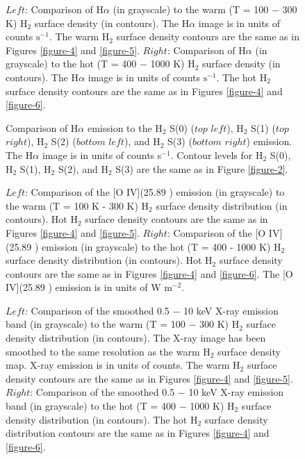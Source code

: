 \documentclass[12pt,preprint]{aastex}
\begin{document}
\clearpage

\begin{figure}
\caption{$Left$: Comparison of  H$\alpha$ (in grayscale) to the warm (T = 100 $-$ 300 K) 
H$_2$ surface density (in contours).  The H$\alpha$ image is in units of counts 
$\mathrm{s^{-1}}$. The warm H$_2$ surface density contours are the same as in 
Figures \ref{figure-4} and \ref{figure-5}.  $Right$: Comparison of H$\alpha$ (in grayscale) 
to the hot (T = 400 $-$ 1000 K) H$_2$ surface density (in contours).  The H$\alpha$ 
image is in units of counts $\mathrm{s^{-1}}$. The hot H$_2$ surface density 
contours are the same as in Figures \ref{figure-4} and \ref{figure-6}.}
\label{figure-10}
\end{figure}

\clearpage

\begin{figure}
\caption{Comparison of H$\alpha$ emission to the H$_2$ S(0) ($top$ $left$),  
H$_2$ S(1) ($top$ $right$),  H$_2$ S(2) ($bottom$ $left$),  and 
H$_2$ S(3) ($bottom$ $right$) emission.  The H$\alpha$ image is in units 
of counts s$^{-1}$.  Contour levels for H$_2$ S(0), H$_2$ S(1), 
H$_2$ S(2), and H$_2$ S(3) are the same as in Figure \ref{figure-2}.}
\label{figure-11}
\end{figure}

\clearpage

\begin{figure}
\caption{$Left$:  Comparison of the [O IV](25.89 \micron) emission (in grayscale) to 
the warm (T = 100 K - 300 K) H$_2$ surface density distribution (in contours).  
Hot H$_2$ surface density contours are the same as in Figures \ref{figure-4} and \ref{figure-5}.  
$Right$: Comparison of the [O IV](25.89 \micron) emission (in grayscale) to the hot 
(T = 400 - 1000 K) H$_2$ surface density distribution (in contours).  Hot H$_2$ 
surface density contours are the same as in Figures \ref{figure-4} and \ref{figure-6}.  The [O IV](25.89 \micron)
 emission is in units of W $\mathrm{m^{-2}}$.}
\label{figure-12}
\end{figure}

\clearpage

\begin{figure}
\caption{$Left$:  Comparison of the smoothed 0.5 $-$ 10 keV X-ray emission band 
(in grayscale) to the warm (T = 100 $-$ 300 K) H$_2$ surface density distribution 
(in contours).   The X-ray image has been smoothed to the same resolution as the 
warm H$_2$ surface density map.  X-ray emission is in units of counts.  The warm H$_2$ 
surface density contours are the same as in Figures \ref{figure-4} and \ref{figure-5}.  $Right$: 
Comparison of the smoothed 0.5 $-$ 10 keV X-ray emission band (in grayscale) to the hot 
(T = 400 $-$ 1000 K) H$_2$ surface density distribution (in contours).  The hot
H$_2$ surface density distribution contours are the same as in Figures \ref{figure-4} 
and \ref{figure-6}.}
\label{figure-13}
\end{figure}
\end{document}
